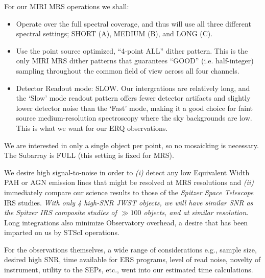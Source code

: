 \smallskip \smallskip
\noindent
For our MIRI MRS operations we shall: 
\begin{itemize}
    \item Operate over the full spectral coverage, and thus will use all three different spectral settings;  
      SHORT (A), MEDIUM (B), and LONG (C). 
    \item Use the point source optimized, ``4-point ALL'' dither pattern.
      This is the only MIRI MRS dither patterns that guarantees ``GOOD''
      (i.e. half-integer) sampling throughout the common field of view
      across all four channels.
    \item{Detector Readout mode: SLOW. 
        Our intergrations are relatively long, and the `Slow' mode readout pattern offers fewer detector
        artifacts and slightly lower detector noise than the `Fast' mode,  
        making it a good choice for faint source medium-resolution
        spectroscopy where the sky backgrounds are low. 
        This is what we want for our ERQ observations.}
\end{itemize}
We are interested in only a single object per point, so no mosaicking is necessary.  
The Subarray is FULL (this setting is fixed for MRS). 

\smallskip \smallskip
\noindent 
We desire high signal-to-noise in order to {\it(i)} detect any low
Equivalent Width PAH or AGN emission lines that might be resolved at
MRS resolutions and {\it(ii)} immediately compare our science results
to those of the {\it Spitzer Space Telescope} IRS studies.  {\it
With only 4 high-SNR JWST objects, we will have similar SNR as the
Spitzer IRS composite studies of $\gg100$ objects, and at similar
resolution.}  Long integrations also minimize Observatory overhead, a
desire that has been imparted on us by STScI operations.

\smallskip \smallskip
\noindent 
For the observations themselves, a wide range of considerations e.g.,
sample size, desired high SNR, time available for ERS programs, level
of read noise, novelty of instrument, utility to the SEPs, etc., went
into our estimated time calculations.

